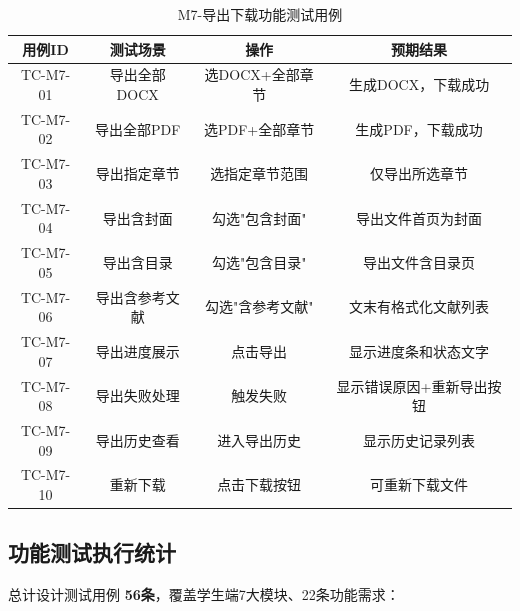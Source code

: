 \begin{table}[htbp]
    \centering
    \caption{M7-导出下载功能测试用例}
    \begin{tabular}{|c|c|c|c|}
        \hline
        \textbf{用例ID} & \textbf{测试场景} & \textbf{操作} & \textbf{预期结果} \\
        \hline
        TC-M7-01 & 导出全部DOCX & 选DOCX+全部章节 & 生成DOCX，下载成功 \\
        \hline
        TC-M7-02 & 导出全部PDF & 选PDF+全部章节 & 生成PDF，下载成功 \\
        \hline
        TC-M7-03 & 导出指定章节 & 选指定章节范围 & 仅导出所选章节 \\
        \hline
        TC-M7-04 & 导出含封面 & 勾选"包含封面" & 导出文件首页为封面 \\
        \hline
        TC-M7-05 & 导出含目录 & 勾选"包含目录" & 导出文件含目录页 \\
        \hline
        TC-M7-06 & 导出含参考文献 & 勾选"含参考文献" & 文末有格式化文献列表 \\
        \hline
        TC-M7-07 & 导出进度展示 & 点击导出 & 显示进度条和状态文字 \\
        \hline
        TC-M7-08 & 导出失败处理 & 触发失败 & 显示错误原因+重新导出按钮 \\
        \hline
        TC-M7-09 & 导出历史查看 & 进入导出历史 & 显示历史记录列表 \\
        \hline
        TC-M7-10 & 重新下载 & 点击下载按钮 & 可重新下载文件 \\
        \hline
    \end{tabular}
\end{table}

\subsection{功能测试执行统计}

总计设计测试用例 \textbf{56条}，覆盖学生端7大模块、22条功能需求：

